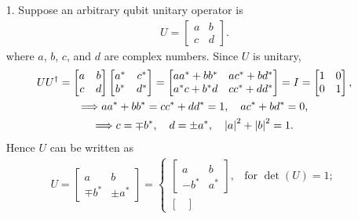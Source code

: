 \documentclass[en]{sol-man}
\begin{document}
\begin{sol}
    \begin{itemize}
        \item[1.] Suppose an arbitrary qubit unitary operator is
        \begin{align}
            U=\begin{bmatrix}
                a&b\\
                c&d
            \end{bmatrix}.
        \end{align}
        where $a$, $b$, $c$, and $d$ are complex numbers. Since $U$ is unitary,
        \begin{gather}
            UU^{\dagger}=\begin{bmatrix}
                a&b\\
                c&d
            \end{bmatrix}\begin{bmatrix}
                a^*&c^*\\
                b^*&d^*
            \end{bmatrix}=\begin{bmatrix}
                aa^*+bb^*&ac^*+bd^*\\
                a^*c+b^*d&cc^*+dd^*
            \end{bmatrix}=I=\begin{bmatrix}
                1&0\\
                0&1
            \end{bmatrix},\\
            \Longrightarrow aa^*+bb^*=cc^*+dd^*=1,\quad ac^*+bd^*=0,\\
            \Longrightarrow c=\mp b^*,\quad d=\pm a^*,\quad\left\lvert a\right\rvert^2+\left\lvert b\right\rvert^2=1.
        \end{gather}
        Hence $U$ can be written as
        \begin{align}
            U=\begin{bmatrix}
                a&b\\
                \mp b^*&\pm a^*
            \end{bmatrix}=\left\{\begin{array}{ll}
                \begin{bmatrix}
                    a&b\\
                    -b^*&a^*
                \end{bmatrix},&\text{for }\det(U)=1;\\
                \begin{bmatrix}

\end{bmatrix}
\end{array}
\end{align}
\end{itemize}
\end{sol}
\end{document}
